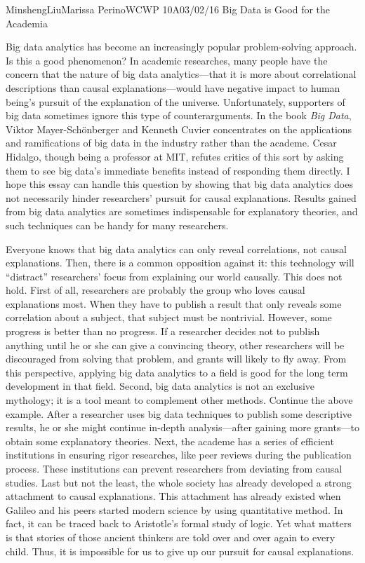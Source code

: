 \documentclass[12pt,letterpaper]{article}
\begin{document}
\begin{mla}{Minsheng}{Liu}{Marissa Perino}{WCWP 10A}{03/02/16}
  {Big Data is Good for the Academia}

Big data analytics has become an increasingly popular problem-solving
approach. Is this a good phenomenon? In academic researches, many people
have the concern that the nature of big data analytics---that it is more
about correlational descriptions than causal explanations---would have
negative impact to human being's pursuit of the explanation of the
universe. Unfortunately, supporters of big data sometimes ignore this
type of counterarguments. In the book \emph{Big Data}, Viktor
Mayer-Schönberger and Kenneth Cuvier concentrates on the applications
and ramifications of big data in the industry rather than the academe.
Cesar Hidalgo, though being a professor at MIT, refutes critics of this
sort by asking them to see big data's immediate benefits instead of
responding them directly. I hope this essay can handle this question by
showing that big data analytics does not necessarily hinder researchers'
pursuit for causal explanations. Results gained from big data analytics
are sometimes indispensable for explanatory theories, and such
techniques can be handy for many researchers.

Everyone knows that big data analytics can only reveal correlations, not
causal explanations. Then, there is a common opposition against it: this
technology will ``distract'' researchers' focus from explaining our
world causally. This does not hold. First of all, researchers are
probably the group who loves causal explanations most. When they have to
publish a result that only reveals some correlation about a subject,
that subject must be nontrivial. However, some progress is better than
no progress. If a researcher decides not to publish anything until he or
she can give a convincing theory, other researchers will be discouraged
from solving that problem, and grants will likely to fly away. From this
perspective, applying big data analytics to a field is good for the long
term development in that field. Second, big data analytics is not an
exclusive mythology; it is a tool meant to complement other methods.
Continue the above example. After a researcher uses big data techniques
to publish some descriptive results, he or she might continue in-depth
analysis---after gaining more grants---to obtain some explanatory
theories. Next, the academe has a series of efficient institutions in
ensuring rigor researches, like peer reviews during the publication
process. These institutions can prevent researchers from deviating from
causal studies. Last but not the least, the whole society has already
developed a strong attachment to causal explanations. This attachment
has already existed when Galileo and his peers started modern science by
using quantitative method. In fact, it can be traced back to Aristotle's
formal study of logic. Yet what matters is that stories of those ancient
thinkers are told over and over again to every child. Thus, it is
impossible for us to give up our pursuit for causal explanations.


\end{mla}
\end{document}
